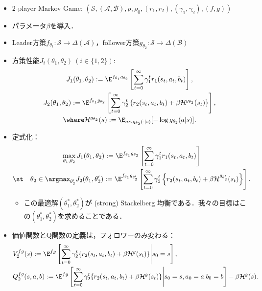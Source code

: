 \documentclass[a4paper,10pt,dvipdfmx]{jsarticle}
\begin{document}
\begin{itemize}
    \item 2-player Markov Game: $(\mathcal{S}, (\mathcal{A},\mathcal{B}), p, \rho_0, (r_1,r_2), (\gamma_1,\gamma_2),(f,g))$
    \item パラメータ$\beta$を導入．
    \item Leader方策$f_{\theta_1}:\mathcal{S}\to\Delta(\mathcal{A})$，follower方策$g_{\theta_2}:\mathcal{S}\to\Delta(\mathcal{B})$
    \item 方策性能$J_i(\theta_1,\theta_2)~(i\in\{1,2\})$:
    \begin{gather}
        J_1(\theta_1,\theta_2):=\E^{f_{\theta_1}g_{\theta_2}}\left[\sum_{t=0}^\infty\gamma_1^tr_1(s_t,a_t,b_t)\right],\\
        J_2(\theta_1,\theta_2):=\E^{f_{\theta_1}g_{\theta_2}}\left[\sum_{t=0}^\infty \gamma_2^t\left\{r_2(s_t,a_t,b_t)+\beta\mathcal{H}^{g_{\theta_2}}(s_t)\right\}\right],\\
        \where \mathcal{H}^{g_{\theta_2}}(s):=\E_{a\sim g_{\theta_2}(\cdot|s)}[-\log g_{\theta_2}(a|s)].
    \end{gather}
    \item 定式化：
    \begin{subequations}
    \begin{gather}
        \max_{\theta_1,\theta_2} J_1(\theta_1,\theta_2):=\E^{f_{\theta_1}g_{\theta_2}}\left[\sum_{t=0}^\infty \gamma_1^tr_1(s_t,a_t,b_t)\right]\\
        \st\quad \theta_2\in\argmax_{\theta_2'} J_2(\theta_1,\theta_2'):=\E^{f_{\theta_1}g_{\theta_2'}}\left[\sum_{t=0}^\infty \gamma_2^t\left\{r_2(s_t,a_t,b_t)+\beta\mathcal{H}^{g_{\theta_2'}}(s_t)\right\}\right].
    \end{gather}\label{eq:formula_SSPG_QR}
    \end{subequations}
    \begin{itemize}
        \item この最適解$(\theta_1^*,\theta_2^*)$が (strong) Stackelberg 均衡である．我々の目標はこの$(\theta_1^*,\theta_2^*)$を求めることである．
    \end{itemize}
    \item 価値関数とQ関数の定義は，フォロワーのみ変わる：
    \begin{align}
        &V_2^{fg}(s):=\E^{fg}\left[\sum_{t=0}^\infty \gamma_2^t\{r_2(s_t,a_t,b_t)+\beta\mathcal{H}^g(s_t)\}\middle|s_0=s\right],\\
        &Q_2^{fg}(s,a,b):=\E^{fg}\left[\sum_{t=0}^\infty \gamma_2^t\{r_2(s_t,a_t,b_t)+\beta\mathcal{H}^g(s_t)\}\middle|s_0=s,a_0=a.b_0=b\right]-\beta\mathcal{H}^g(s).
    \end{align}


\end{itemize}
\end{document}
